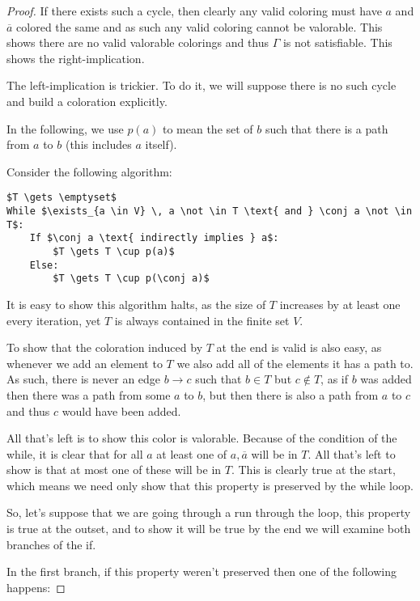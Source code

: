 \documentclass[11pt]{article}
\newcommand{\conj}[1]{\overline{#1}}
\begin{document}
\begin{proof}
If there exists such a cycle, then clearly any valid coloring must have $a$ and $\conj a$ colored the same and as such any valid coloring cannot be valorable. This shows there are no valid valorable colorings and thus $\Gamma$ is not satisfiable. This shows the right-implication.

The left-implication is trickier. To do it, we will suppose there is no such cycle and build a coloration explicitly.

In the following, we use $p(a)$ to mean the set of $b$ such that there is a path from $a$ to $b$ (this includes $a$ itself).

Consider the following algorithm:

\begin{lstlisting}[mathescape]
$T \gets \emptyset$
While $\exists_{a \in V} \, a \not \in T \text{ and } \conj a \not \in T$:
    If $\conj a \text{ indirectly implies } a$:
        $T \gets T \cup p(a)$
    Else:
        $T \gets T \cup p(\conj a)$
\end{lstlisting}

It is easy to show this algorithm halts, as the size of $T$ increases by at least one every iteration, yet $T$ is always contained in the finite set $V$.

To show that the coloration induced by $T$ at the end is valid is also easy, as whenever we add an element to $T$ we also add all of the elements it has a path to. As such, there is never an edge $b \rightarrow c$ such that $b \in T$ but $c \not \in T$, as if $b$ was added then there was a path from some $a$ to $b$, but then there is also a path from $a$ to $c$ and thus $c$ would have been added.


All that's left is to show this color is valorable. Because of the condition of the while, it is clear that for all $a$ at least one of $a, \conj a$ will be in $T$. All that's left to show is that at most one of these will be in $T$. This is clearly true at the start, which means we need only show that this property is preserved by the while loop.

So, let's suppose that we are going through a run through the loop, this property is true at the outset, and to show it will be true by the end we will examine both branches of the if.

In the first branch, if this property weren't preserved then one of the following happens:


\end{proof}
\end{document}
